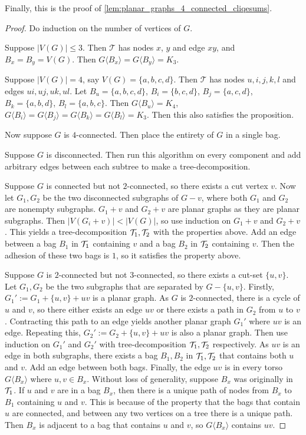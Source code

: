 Finally, this is the proof of \cref{lem:planar_graphs_4_connected_cliqesums}.
\begin{proof}
	Do induction on the number of vertices of $G$. 
	
	Suppose $|V(G)| \leq 3$. Then $\mathcal{T}$ has nodes $x$, $y$ and edge $xy$, and $B_x = B_y = V(G)$. Then $G \langle B_x \rangle = G \langle B_y \rangle = K_3$. 
	
	Suppose $|V(G)| = 4$, say $V(G) = \{a,b,c,d\}$.  Then $\mathcal{T}$ has nodes $u, i,j,k,l$ and edges $ui, uj, uk, ul$. Let $B_u = \{a,b,c,d\}$, $B_i = \{b,c,d\}$, $B_j = \{a,c,d\}$, $B_k = \{a,b,d\}$, $B_l = \{a,b,c\}$. Then $G\langle B_u \rangle = K_4$, $G\langle B_i \rangle =G\langle B_j\rangle = G\langle B_k \rangle = G\langle B_l \rangle = K_3$. Then this also satisfies the proposition. 

	Now suppose $G$ is $4$-connected. Then place the entirety of $G$ in a single bag.

	Suppose $G$ is disconnected. Then run this algorithm on every component and add arbitrary edges between each subtree to make a tree-decomposition.

	Suppose $G$ is connected but not $2$-connected, so there exists a cut vertex $v$. Now let $G_1, G_2$ be the two disconnected subgraphs of $G - v$, where both $G_1$ and $G_2$ are nonempty subgraphs. $G_1 + v$ and $G_2 + v$ are planar graphs as they are planar subgraphs. Then $|V(G_i + v)| < |V(G)|$, so use induction on $G_1 + v$ and $G_2 + v$. This yields a tree-decomposition $\mathcal{T}_1, \mathcal{T}_2$ with the properties above. Add an edge between a bag $B_1$ in $\mathcal{T}_1$ containing $v$ and a bag $B_2$ in $\mathcal{T}_2$ containing $v$. Then the adhesion of these two bags is $1$, so it satisfies the property above. 

	Suppose $G$ is $2$-connected but not $3$-connected, so there exists a cut-set $\{u,v\}$. Let $G_1, G_2$ be the two subgraphs that are separated by $G - \{u, v\}$. Firstly, $G_1' := G_1 + \{u,v\} + uv$ is a planar graph. As $G$ is $2$-connected, there is a cycle of $u$ and $v$, so there either exists an edge $uv$ or there exists a path in $G_2$ from $u$ to $v$. Contracting this path to an edge yields another planar graph $G_1'$ where $uv$ is an edge. Repeating this, $G_2' := G_2 + \{u,v\} + uv$ is also a planar graph. Then use induction on $G_1'$ and $G_2'$ with tree-decomposition $\mathcal{T}_1, \mathcal{T}_2$ respectively. As $uv$ is an edge in both subgraphs, there exists a bag $B_1, B_2$ in $\mathcal{T}_1, \mathcal{T}_2$ that contains both $u$ and $v$. Add an edge between both bags. Finally, the edge $uv$ is in every torso $G\langle B_x \rangle$ where $u, v \in B_x$. Without loss of generality, suppose $B_x$ was originally in $\mathcal{T}_1$. If $u$ and $v$ are in a bag $B_x$, then there is a unique path of nodes from $B_x$ to $B_1$ containing $u$ and $v$. This is because of the property that the bags that contain $u$ are connected, and between any two vertices on a tree there is a unique path. Then $B_x$ is adjacent to a bag that contains $u$ and $v$, so $G \langle B_x \rangle$ contains $uv$. 


\end{proof}
